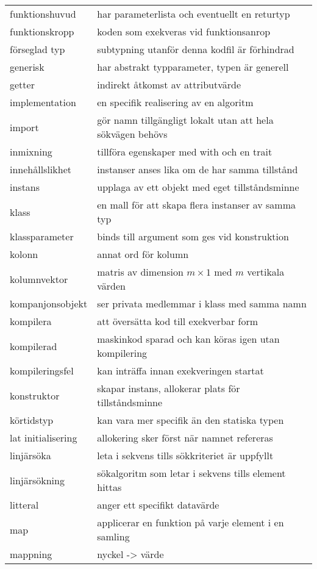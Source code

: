 \begin{tabular}{l|l}
funktionshuvud & har parameterlista och eventuellt en returtyp \\
funktionskropp & koden som exekveras vid funktionsanrop \\
förseglad typ & subtypning utanför denna kodfil är förhindrad \\
generisk & har abstrakt typparameter, typen är generell \\
getter & indirekt åtkomst av attributvärde \\
implementation & en specifik realisering av en algoritm \\
import & gör namn tillgängligt lokalt utan att hela sökvägen behövs \\
inmixning & tillföra egenskaper med with och en trait \\
innehållslikhet & instanser anses lika om de har samma tillstånd \\
instans & upplaga av ett objekt med eget tillståndsminne \\
klass & en mall för att skapa flera instanser av samma typ \\
klassparameter & binds till argument som ges vid konstruktion \\
kolonn & annat ord för kolumn \\
kolumnvektor & matris av dimension $m\times{}1$ med $m$ vertikala värden \\
kompanjonsobjekt & ser privata medlemmar i klass med samma namn \\
kompilera & att översätta kod till exekverbar form \\
kompilerad & maskinkod sparad och kan köras igen utan kompilering \\
kompileringsfel & kan inträffa innan exekveringen startat \\
konstruktor & skapar instans, allokerar plats för tillståndsminne \\
körtidstyp & kan vara mer specifik än den statiska typen \\
lat initialisering & allokering sker först när namnet refereras \\
linjärsöka & leta i sekvens tills sökkriteriet är uppfyllt \\
linjärsökning & sökalgoritm som letar i sekvens tills element hittas \\
litteral & anger ett specifikt datavärde \\
map & applicerar en funktion på varje element i en samling \\
mappning & nyckel -> värde \\

\end{tabular}
